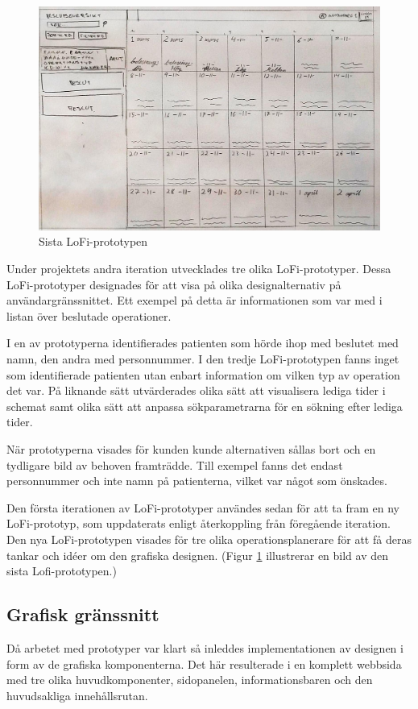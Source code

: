 \begin{figure}[H]
  \includegraphics[width=\linewidth]{Figures/LoFi_no2.jpg}
  \caption{Sista LoFi-prototypen}
  \label{fig:LofiPic}
\end{figure}


Under projektets andra iteration utvecklades tre olika LoFi-prototyper. Dessa
LoFi-prototyper designades för att visa på olika designalternativ på
användargränssnittet. Ett exempel på detta är informationen som var med i listan
över beslutade operationer.

I en av prototyperna identifierades patienten som hörde ihop med beslutet med namn, den andra med personnummer. I den tredje LoFi-prototypen
fanns inget som identifierade patienten utan enbart information om vilken
typ av operation det var. På liknande sätt utvärderades olika sätt att
visualisera lediga tider i schemat samt olika sätt att anpassa sökparametrarna för en sökning efter lediga tider.

När prototyperna visades för kunden kunde alternativen sållas bort och en tydligare bild av behoven framträdde.
Till exempel fanns det endast personnummer och inte namn på patienterna, vilket var något som önskades.

Den första iterationen av LoFi-prototyper användes sedan för att ta fram en ny
LoFi-prototyp, som uppdaterats enligt återkoppling från föregående iteration. Den nya LoFi-prototypen visades för tre olika operationsplanerare för att få deras tankar och idéer om den grafiska designen. (Figur \ref{fig:LofiPic} illustrerar en bild av den sista Lofi-prototypen.)

\subsection{Grafisk gränssnitt}
Då arbetet med prototyper var klart så inleddes implementationen av designen i form av de grafiska komponenterna. Det här resulterade i en komplett webbsida med tre olika huvudkomponenter, sidopanelen, informationsbaren och den huvudsakliga innehållsrutan.

